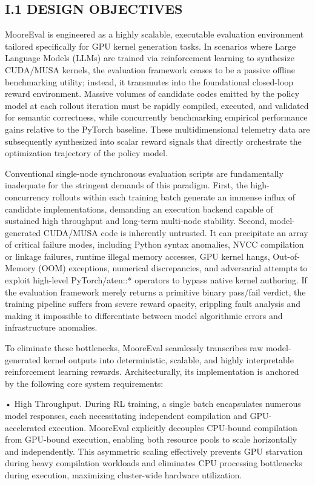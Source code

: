 \documentclass[
  10
]{article}
\begin{document}
\subsection{I.1 DESIGN OBJECTIVES}\label{i.1-design-objectives}

MooreEval is engineered as a highly scalable, executable evaluation
environment tailored specifically for GPU kernel generation tasks. In
scenarios where Large Language Models (LLMs) are trained via
reinforcement learning to synthesize CUDA/MUSA kernels, the evaluation
framework ceases to be a passive offline benchmarking utility; instead,
it transmutes into the foundational closed-loop reward environment.
Massive volumes of candidate codes emitted by the policy model at each
rollout iteration must be rapidly compiled, executed, and validated for
semantic correctness, while concurrently benchmarking empirical
performance gains relative to the PyTorch baseline. These
multidimensional telemetry data are subsequently synthesized into scalar
reward signals that directly orchestrate the optimization trajectory of
the policy model.

Conventional single-node synchronous evaluation scripts are
fundamentally inadequate for the stringent demands of this paradigm.
First, the high-concurrency rollouts within each training batch generate
an immense influx of candidate implementations, demanding an execution
backend capable of sustained high throughput and long-term multi-node
stability. Second, model-generated CUDA/MUSA code is inherently
untrusted. It can precipitate an array of critical failure modes,
including Python syntax anomalies, NVCC compilation or linkage failures,
runtime illegal memory accesses, GPU kernel hangs, Out-of-Memory (OOM)
exceptions, numerical discrepancies, and adversarial attempts to exploit
high-level PyTorch/aten::* operators to bypass native kernel authoring.
If the evaluation framework merely returns a primitive binary pass/fail
verdict, the training pipeline suffers from severe reward opacity,
crippling fault analysis and making it impossible to differentiate
between model algorithmic errors and infrastructure anomalies.

To eliminate these bottlenecks, MooreEval seamlessly transcribes raw
model-generated kernel outputs into deterministic, scalable, and highly
interpretable reinforcement learning rewards. Architecturally, its
implementation is anchored by the following core system requirements:

• High Throughput. During RL training, a single batch encapsulates
numerous model responses, each necessitating independent compilation and
GPU-accelerated execution. MooreEval explicitly decouples CPU-bound
compilation from GPU-bound execution, enabling both resource pools to
scale horizontally and independently. This asymmetric scaling
effectively prevents GPU starvation during heavy compilation workloads
and eliminates CPU processing bottlenecks during execution, maximizing
cluster-wide hardware utilization.
\end{document}
